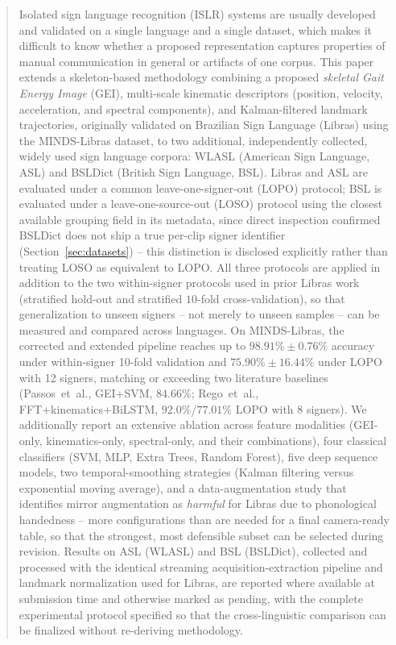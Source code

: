 \documentclass[journal]{IEEEtran}
\begin{document}
\begin{abstract}
Isolated sign language recognition (ISLR) systems are usually developed and validated on a single language and a single dataset, which makes it difficult to know whether a proposed representation captures properties of manual communication in general or artifacts of one corpus. This paper extends a skeleton-based methodology combining a proposed \emph{skeletal Gait Energy Image} (GEI), multi-scale kinematic descriptors (position, velocity, acceleration, and spectral components), and Kalman-filtered landmark trajectories, originally validated on Brazilian Sign Language (Libras) using the MINDS-Libras dataset, to two additional, independently collected, widely used sign language corpora: WLASL (American Sign Language, ASL) and BSLDict (British Sign Language, BSL). Libras and ASL are evaluated under a common leave-one-signer-out (LOPO) protocol; BSL is evaluated under a leave-one-source-out (LOSO) protocol using the closest available grouping field in its metadata, since direct inspection confirmed BSLDict does not ship a true per-clip signer identifier (Section~\ref{sec:datasets}) -- this distinction is disclosed explicitly rather than treating LOSO as equivalent to LOPO. All three protocols are applied in addition to the two within-signer protocols used in prior Libras work (stratified hold-out and stratified $10$-fold cross-validation), so that generalization to unseen signers -- not merely to unseen samples -- can be measured and compared across languages. On MINDS-Libras, the corrected and extended pipeline reaches up to $98.91\%\pm0.76\%$ accuracy under within-signer 10-fold validation and $75.90\%\pm16.44\%$ under LOPO with 12 signers, matching or exceeding two literature baselines (Passos~et~al., GEI+SVM, $84.66\%$; Rego~et~al., FFT+kinematics+BiLSTM, $92.0\%$/$77.01\%$ LOPO with 8 signers). We additionally report an extensive ablation across feature modalities (GEI-only, kinematics-only, spectral-only, and their combinations), four classical classifiers (SVM, MLP, Extra Trees, Random Forest), five deep sequence models, two temporal-smoothing strategies (Kalman filtering versus exponential moving average), and a data-augmentation study that identifies mirror augmentation as \emph{harmful} for Libras due to phonological handedness -- more configurations than are needed for a final camera-ready table, so that the strongest, most defensible subset can be selected during revision. Results on ASL (WLASL) and BSL (BSLDict), collected and processed with the identical streaming acquisition-extraction pipeline and landmark normalization used for Libras, are reported where available at submission time and otherwise marked as pending, with the complete experimental protocol specified so that the cross-linguistic comparison can be finalized without re-deriving methodology.
\end{abstract}
\end{document}
